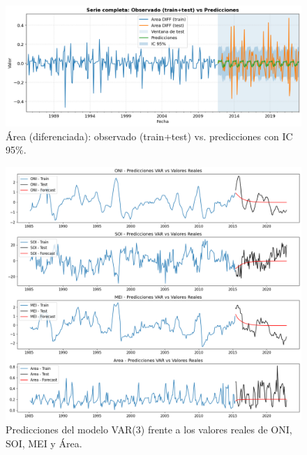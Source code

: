\begin{figure}[H]\centering
\includegraphics[scale=.42]{Figures/pred_area_d.png}
\caption{Área (diferenciada): observado (train+test) vs. predicciones con IC 95\%.}
\label{fig:pred_area_d}
\end{figure}

\begin{figure}[H]
    \centering
    \includegraphics[scale=0.32]{Figures/var_pred.png}
    \caption{Predicciones del modelo VAR(3) frente a los valores reales de ONI, SOI, MEI y Área.}
    \label{fig:var_pred}
\end{figure}